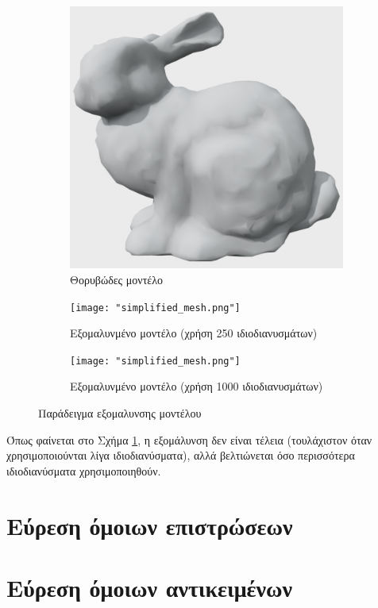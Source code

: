 \documentclass[draft]{article}
\begin{document}
\begin{figure}[h]
	\begin{subfigure}{0.5\textwidth}
		\includegraphics[width=0.9\linewidth]{"noisy_mesh.png"}
		\caption{Θορυβώδες μοντέλο}
	\end{subfigure}
	\begin{subfigure}{0.5\textwidth}
		\texttt{[image: "simplified\_mesh.png"]}
		\caption{Εξομαλυνμένο μοντέλο (χρήση 250 ιδιοδιανυσμάτων)}
	\end{subfigure}
	\begin{subfigure}{0.5\textwidth}
		\texttt{[image: "simplified\_mesh.png"]}
		\caption{Εξομαλυνμένο μοντέλο (χρήση 1000 ιδιοδιανυσμάτων)}
	\end{subfigure}
	\label{fig:simplify}
	\caption{Παράδειγμα εξομαλυνσης μοντέλου}
\end{figure}

Όπως φαίνεται στο Σχήμα \ref{fig:simplify}, η εξομάλυνση δεν είναι τέλεια
(τουλάχιστον όταν χρησιμοποιούνται λίγα ιδιοδιανύσματα), αλλά βελτιώνεται όσο
περισσότερα ιδιοδιανύσματα χρησιμοποιηθούν.

\section{Εύρεση όμοιων επιστρώσεων}


\section{Εύρεση όμοιων αντικειμένων}

\end{document}
